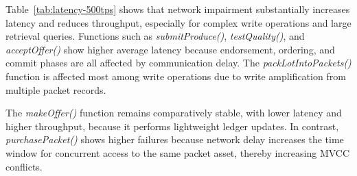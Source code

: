 \documentclass[manuscript,screen]{acmart}
\begin{document}
\begin{table}[h]
	\centering
	\caption{Performance Comparison of Smart Contract Functions at 500 TPS under Network Impairment}
	\label{tab:latency-500tps}
\end{table}

Table~\ref{tab:latency-500tps} shows that network impairment substantially increases latency and reduces throughput, especially for complex write operations and large retrieval queries. Functions such as \textit{submitProduce()}, \textit{testQuality()}, and \textit{acceptOffer()} show higher average latency because endorsement, ordering, and commit phases are all affected by communication delay. The \textit{packLotIntoPackets()} function is affected most among write operations due to write amplification from multiple packet records.

The \textit{makeOffer()} function remains comparatively stable, with lower latency and higher throughput, because it performs lightweight ledger updates. In contrast, \textit{purchasePacket()} shows higher failures because network delay increases the time window for concurrent access to the same packet asset, thereby increasing MVCC conflicts.
\end{document}
